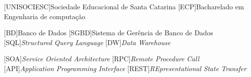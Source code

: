 
[UNISOCIESC]{Sociedade Educacional de Santa Catarina}
[ECP]{Bacharelado em Engenharia de computação}

[BD]{Banco de Dados}
[SGBD]{Sistema de Gerência de Banco de Dados}
[SQL]{\emph{Structured Query Language}}
[DW]{\emph{Data Warehouse}}

[SOA]{\emph{Service Oriented Architecture}}
[RPC]{\emph{Remote Procedure Call}}
[API]{\emph{Application Programming Interface}}
[REST]{\emph{REpresentational State Transfer}}
